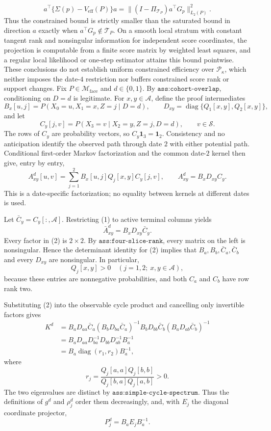\[
 a^\top\{\Sigma(p)-V_{\mathrm{eff}}(P)\}a
 =\|(I-\Pi_{\mathcal T_P})a^\top G_p\|_{L_2(P)}^2.
\]
Thus the constrained bound is strictly smaller than the saturated bound in direction \(a\) exactly when \(a^\top G_p\notin\mathcal T_P\).  On a smooth local stratum with constant tangent rank and nonsingular information for independent score coordinates, the projection is computable from a finite score matrix by weighted least squares, and a regular local likelihood or one-step estimator attains this bound pointwise.  These conclusions do not establish uniform constrained efficiency over \(\mathcal P_{\kappa}\), which neither imposes the date-\(4\) restriction nor buffers constrained score rank or support changes.
Fix \(P\in\mathcal M_{\mathrm{face}}\) and \(d\in\{0,1\}\).  By \(\texttt{ass:cohort-overlap}\), conditioning on \(D=d\) is legitimate.  For \(x,y\in\mathcal A\), define the proof intermediates
\[
 B_x[u,j]=P(X_0=u,X_1=x,Z=j\mid D=d),\qquad
 D_{xy}=\operatorname{diag}\{Q_1[x,y],Q_2[x,y]\},
\]
and let
\[
 C_y[j,v]=P(X_3=v\mid X_2=y,Z=j,D=d),\qquad v\in\mathcal S.
\]
The rows of \(C_y\) are probability vectors, so \(C_y\mathbf 1_3=\mathbf 1_2\).  Consistency and no anticipation identify the observed path through date \(2\) with either potential path.  Conditional first-order Markov factorization and the common date-\(2\) kernel then give, entry by entry,
\[
 A_{xy}^d[u,v]
 =\sum_{j=1}^2B_x[u,j]Q_j[x,y]C_y[j,v],
 \qquad A_{xy}^d=B_xD_{xy}C_y.                              \tag{1}
\]
This is a date-specific factorization; no equality between kernels at different dates is used.

Let \(\bar C_y=C_y[:,\mathcal A]\).  Restricting (1) to active terminal columns yields
\[
 \bar A_{xy}^d=B_xD_{xy}\bar C_y.                           \tag{2}
\]
Every factor in (2) is \(2\times2\).  By \(\texttt{ass:four-slice-rank}\), every matrix on the left is nonsingular.  Hence the determinant identity for (2) implies that \(B_a,B_b,\bar C_a,\bar C_b\) and every \(D_{xy}\) are nonsingular.  In particular,
\[
 Q_j[x,y]>0\quad(j=1,2;\ x,y\in\mathcal A),                 \tag{3}
\]
because these entries are nonnegative probabilities, and both \(C_a\) and \(C_b\) have row rank two.

Substituting (2) into the observable cycle product and cancelling only invertible factors gives
\[
 \begin{aligned}
 K^d
 &=B_aD_{aa}\bar C_a(B_bD_{ba}\bar C_a)^{-1}
   B_bD_{bb}\bar C_b(B_aD_{ab}\bar C_b)^{-1}\\
 &=B_aD_{aa}D_{ba}^{-1}D_{bb}D_{ab}^{-1}B_a^{-1}\\
 &=B_a\operatorname{diag}(r_1,r_2)B_a^{-1},
 \end{aligned}                                               \tag{4}
\]
where
\[
 r_j=\frac{Q_j[a,a]Q_j[b,b]}{Q_j[b,a]Q_j[a,b]}>0.            \tag{5}
\]
The two eigenvalues are distinct by \(\texttt{ass:simple-cycle-spectrum}\).  Thus the definitions of \(g^d\) and \(\rho_j^d\) order them decreasingly, and, with \(E_j\) the diagonal coordinate projector,
\[
 P_j^d=B_aE_jB_a^{-1}.                                      \tag{6}
\]

